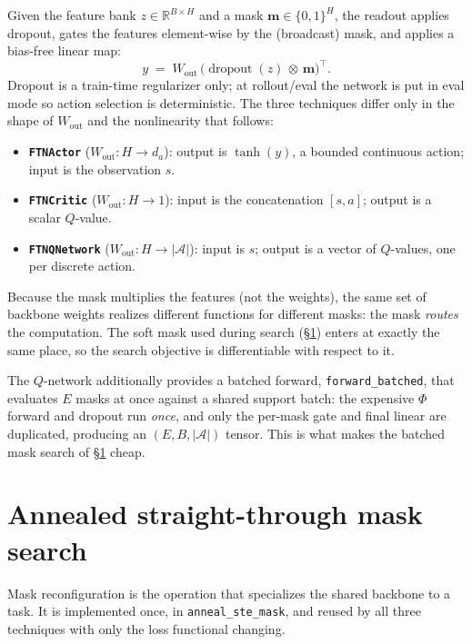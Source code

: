 \documentclass[11pt]{article}
\newcommand{\R}{\mathbb{R}}
\newcommand{\obs}{s}
\newcommand{\act}{a}
\newcommand{\parMLP}{\Phi}                 %
\newcommand{\mask}{\bm{m}}                 %
\newcommand{\Ho}{H}                        %
\newcommand{\code}[1]{\texttt{\small #1}}
\begin{document}
Given the feature bank $z \in \R^{B\times\Ho}$ and a mask $\mask\in\{0,1\}^{\Ho}$,
the readout applies dropout, gates the features element-wise by the (broadcast)
mask, and applies a bias-free linear map:
\[
y \;=\; W_{\mathrm{out}}\,\bigl(\operatorname{dropout}(z)\,\otimes\, \mask\bigr)^{\!\top}.
\]
Dropout is a train-time regularizer only; at rollout/eval the network is put in
eval mode so action selection is deterministic. The three techniques differ only
in the shape of $W_{\mathrm{out}}$ and the nonlinearity that follows:
\begin{itemize}[leftmargin=1.5em,itemsep=1pt]
  \item \textbf{\code{FTNActor}} ($W_{\mathrm{out}}\!:\Ho\to d_a$): output is
  $\tanh(y)$, a bounded continuous action; input is the observation $\obs$.
  \item \textbf{\code{FTNCritic}} ($W_{\mathrm{out}}\!:\Ho\to 1$): input is the
  concatenation $[\obs,\act]$; output is a scalar $Q$-value.
  \item \textbf{\code{FTNQNetwork}} ($W_{\mathrm{out}}\!:\Ho\to |\mathcal{A}|$):
  input is $\obs$; output is a vector of $Q$-values, one per discrete action.
\end{itemize}
Because the mask multiplies the features (not the weights), the same set of
backbone weights realizes different functions for different masks: the mask
\emph{routes} the computation. The soft mask used during search
(\S\ref{sec:ste}) enters at exactly the same place, so the search objective is
differentiable with respect to it.

The $Q$-network additionally provides a batched forward, \code{forward\_batched},
that evaluates $E$ masks at once against a shared support batch: the expensive
$\parMLP$ forward and dropout run \emph{once}, and only the per-mask gate and
final linear are duplicated, producing an $(E, B, |\mathcal{A}|)$ tensor. This is
what makes the batched mask search of \S\ref{sec:ste} cheap.

\section{Annealed straight-through mask search}
\label{sec:ste}

Mask reconfiguration is the operation that specializes the shared backbone to a
task. It is implemented once, in \code{anneal\_ste\_mask}, and reused by all three
techniques with only the loss functional changing.
\end{document}
